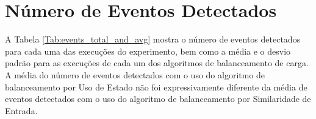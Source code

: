 


\section{Número de Eventos Detectados}
\label{sec:number_of_detected_events}


A Tabela \ref{Tab:events_total_and_avg} mostra o número de eventos detectados para cada uma das execuções do experimento, bem como a média e o desvio padrão para as execuções de cada um dos algoritmos de balanceamento de carga. A média do número de eventos detectados com o uso do algoritmo de balanceamento por Uso de Estado não foi expressivamente diferente da média de eventos detectados com o uso do algoritmo de balanceamento por Similaridade de Entrada. %




